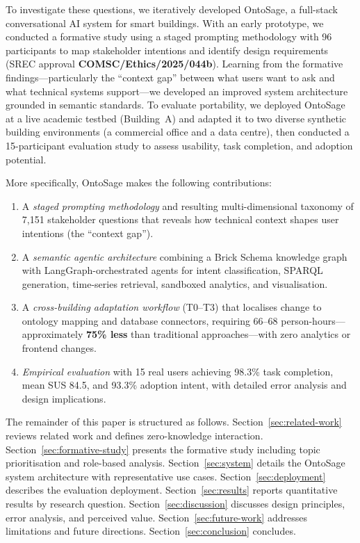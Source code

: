 \documentclass[acmsmall]{acmart}
\begin{document}
To investigate these questions, we iteratively developed OntoSage, a full-stack conversational AI system for smart buildings. With an early prototype, we conducted a formative study using a staged prompting methodology with 96 participants to map stakeholder intentions and identify design requirements (SREC approval \textbf{COMSC/Ethics/2025/044b}). Learning from the formative findings---particularly the ``context gap'' between what users want to ask and what technical systems support---we developed an improved system architecture grounded in semantic standards. To evaluate portability, we deployed OntoSage at a live academic testbed (Building~A) and adapted it to two diverse synthetic building environments (a commercial office and a data centre), then conducted a 15-participant evaluation study to assess usability, task completion, and adoption potential.

More specifically, OntoSage makes the following contributions:
\begin{enumerate}
    \item A \emph{staged prompting methodology} and resulting multi-dimensional taxonomy of 7{,}151 stakeholder questions that reveals how technical context shapes user intentions (the ``context gap'').
    \item A \emph{semantic agentic architecture} combining a Brick Schema knowledge graph with LangGraph-orchestrated agents for intent classification, SPARQL generation, time-series retrieval, sandboxed analytics, and visualisation.
    \item A \emph{cross-building adaptation workflow} (T0--T3) that localises change to ontology mapping and database connectors, requiring 66--68 person-hours---approximately \textbf{75\% less} than traditional approaches---with zero analytics or frontend changes.
    \item \emph{Empirical evaluation} with 15 real users achieving 98.3\% task completion, mean SUS 84.5, and 93.3\% adoption intent, with detailed error analysis and design implications.
\end{enumerate}

The remainder of this paper is structured as follows. Section~\ref{sec:related-work} reviews related work and defines zero-knowledge interaction. Section~\ref{sec:formative-study} presents the formative study including topic prioritisation and role-based analysis. Section~\ref{sec:system} details the OntoSage system architecture with representative use cases. Section~\ref{sec:deployment} describes the evaluation deployment. Section~\ref{sec:results} reports quantitative results by research question. Section~\ref{sec:discussion} discusses design principles, error analysis, and perceived value. Section~\ref{sec:future-work} addresses limitations and future directions. Section~\ref{sec:conclusion} concludes.
\end{document}
